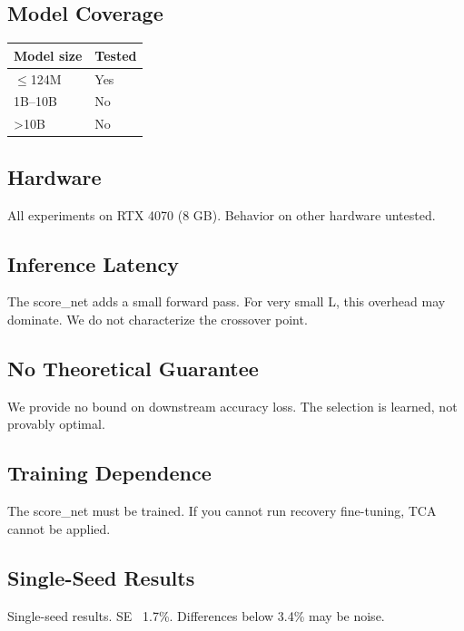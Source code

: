 \subsection{Model Coverage}

\begin{table}[H]
\centering
\small
\begin{tabular}{ll}
\toprule
\textbf{Model size} & \textbf{Tested} \\
\midrule
$\le$124M & Yes \\
1B--10B & No \\
>10B & No \\
\bottomrule
\end{tabular}
\end{table}

\subsection{Hardware}

All experiments on RTX 4070 (8 GB). Behavior on other hardware untested.

\subsection{Inference Latency}

The score\_net adds a small forward pass. For very small L, this overhead 
may dominate. We do not characterize the crossover point.

\subsection{No Theoretical Guarantee}

We provide no bound on downstream accuracy loss. The selection is learned, 
not provably optimal.

\subsection{Training Dependence}

The score\_net must be trained. If you cannot run recovery fine-tuning, TCA 
cannot be applied.

\subsection{Single-Seed Results}

Single-seed results. SE ~1.7\%. Differences below 3.4\% may be noise.

